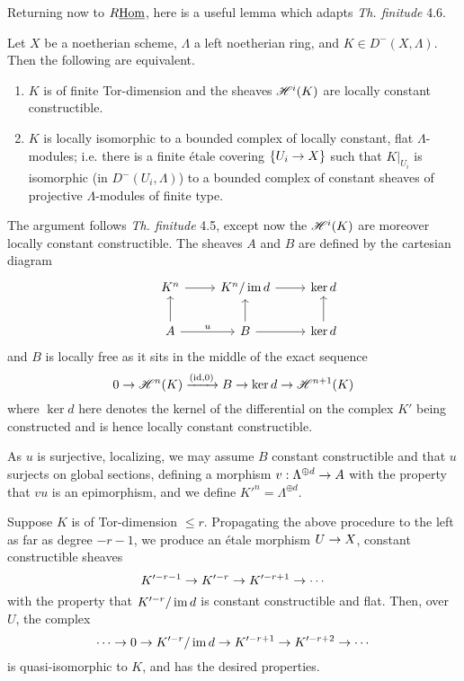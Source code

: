 \documentclass[deligne.tex]{subfiles}
\begin{document}
Returning now to $R\underline{\operatorname{Hom}}$,
here is a useful lemma which adapts \textit{Th. finitude} 4.6.
\begin{lemma*}
    Let $X$ be a noetherian scheme, $\Lambda$ a left noetherian 
    ring, and $K\in D^-(X,\Lambda)$. Then the following are equivalent.
    \begin{enumerate}
    \item $K$ is of finite Tor-dimension and the sheaves $\mathscr H^i(K)$ are
    locally constant constructible.
    \item $K$ is locally isomorphic to a bounded 
    complex of locally constant, flat $\Lambda$-modules; i.e. there is
    a finite étale covering $\{U_i\rightarrow X\}$ such that $K|_{U_i}$ is
    isomorphic (in $D^-(U_i,\Lambda)$) to a bounded complex of constant 
    sheaves of projective $\Lambda$-modules of finite type.
    \end{enumerate}
\end{lemma*}
The argument follows \textit{Th. finitude} 4.5, except now the
$\mathscr H^i(K)$ are moreover locally constant constructible. The sheaves $A$ 
and $B$ are defined by the cartesian diagram
\begin{equation*}
\begin{tikzcd}
&K^n\arrow[r]&K^n/\im d\arrow[r]&\ker d \\
&A\arrow[u]\arrow[r,"u"]&B\arrow[r]\arrow[u]&\ker d\arrow[u]
\end{tikzcd}
\end{equation*}
and $B$ is locally free as it sits in the middle of the exact sequence
\begin{equation*}
    0\rightarrow\mathscr H^n(K)\xrightarrow{(\operatorname{id},0)} B\rightarrow\ker d\rightarrow\mathscr H^{n+1}(K)
\end{equation*}
where $\ker d$ here denotes the kernel of the differential on the complex 
$K'$ being constructed and is hence locally constant constructible.

As $u$ is surjective, localizing, we may assume $B$ constant constructible
and that $u$ surjects on
global sections, defining a morphism $v:\Lambda^{\oplus d}\rightarrow A$ with
the property that $vu$ is an epimorphism, and we define
$K'^n=\Lambda^{\oplus d}$.

Suppose $K$ is of Tor-dimension $\leq r$. Propagating the above procedure 
to the left as far as degree $-r-1$, we produce an étale morphism
$U\rightarrow X$, constant constructible sheaves
\begin{equation*}
    K'^{-r-1}\rightarrow K'^{-r}\rightarrow K'^{-r+1}\rightarrow\cdots
\end{equation*}
with the property that $K'^{-r}/\operatorname{im} d$ is constant constructible and flat.
Then, over $U$, the complex
\begin{equation*}
    \cdots\rightarrow0\rightarrow K'^{-r}/\operatorname{im} d\rightarrow K'^{-r+1}\rightarrow K'^{-r+2}\rightarrow\cdots
\end{equation*}
is quasi-isomorphic to $K$, and has the desired properties.
\end{document}
